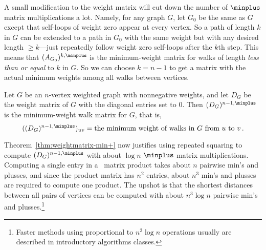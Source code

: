 A small modification to the weight matrix will cut down the number of
$\minplus$ matrix multiplications a lot.  Namely, for any graph $G$,
let $G_0$ be the same as $G$ except that self-loops of weight zero
appear at every vertex.  So a path of length $k$ in $G$ can be
extended to a path in $G_0$ with the same weight but with any desired
length $\geq k$---just repeatedly follow weight zero self-loops after
the $k$th step.  This means that $(A_{G_0})^{k, \minplus}$ is the
minimum-weight matrix for walks of length \emph{less than or equal} to
$k$ in $G$.  So we can choose $k = n-1$ to get a matrix with the
actual minimum weights among all walks between vertices.

\begin{theorem}\label{thm:minweightmatrix}
Let $G$ be an $n$-vertex weighted graph with nonnegative weights, and let
$D_G$ be the weight matrix of $G$ with the diagonal entries set to 0.
Then $(D_G)^{n-1, \minplus}$ is the minimum-weight walk matrix for $G$, that
is,
\[
((D_G)^{n-1, \minplus})_{uv} = \text{the minimum weight of walks in $G$ from
 $u$ to $v$}\,.
\]
\end{theorem}
Theorem~\ref{thm:weightmatrix-min+} now justifies using repeated
squaring to compute $(D_G)^{n-1, \minplus}$ with about $\log n$
$\minplus$ matrix multiplications.  Computing a single entry in a
\minplus\ matrix product takes about $n$ pairwise min's and plusses,
and since the product matrix has $n^2$ entries, about $n^3$ min's and
plusses are required to compute one product.  The upshot is that the
shortest distances between all pairs of vertices can be computed with
about $n^3\log n$ pairwise min's and plusses.\footnote{Faster methods
  using proportional to $n^2\log n$ operations usually are described
  in introductory algorithms classes.}
